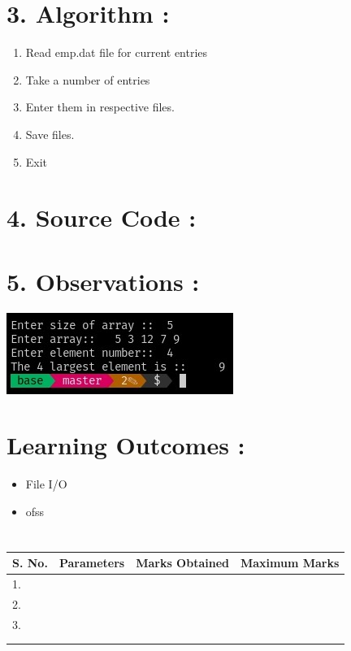 \documentclass[14pt]{extarticle}
\begin{document}

\section*{\normalsize 3. Algorithm :}

\begin{enumerate}
  \item Read emp.dat file for current entries
  \item Take a number of entries
  \item Enter them in respective files.
  \item Save files.
  \item Exit
\end{enumerate}


\newpage
\section*{\normalsize 4. Source Code :}

 

\newpage
\section*{\normalsize 5. Observations :}

\begin{center}
\includegraphics[scale=1.15]{temp/output.jpeg}
\end{center}

\section*{\normalsize Learning Outcomes :}
  
  \begin{itemize}
    \item File I/O
    \item ofss
  \end{itemize}

\section*{}

\begin{center}

\begin{tabular}{ |p{2.5cm}|p{4cm}|p{5cm}|p{5cm}|} 
 \hline
 S. No. & Parameters & Marks Obtained & Maximum Marks \\
 \hline
 1.&&&\\
 \hline
 2.&&&\\
 \hline
 3.&&&\\
 \hline
 &&&\\
 &&&\\
 \hline
\end{tabular}
\end{center}
\end{document}
